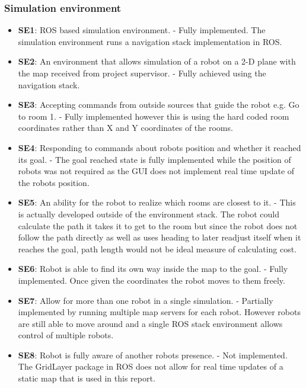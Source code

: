       \subsubsection{Simulation environment}
      \begin{itemize}
        \item \textbf{SE1}: ROS based simulation environment. - Fully implemented. The simulation environment runs a navigation stack implementation in ROS.

        \item \textbf{SE2}: An environment that allows simulation of a robot on a 2-D plane with the map received from project supervisor. - Fully achieved using the navigation stack.

        \item \textbf{SE3}: Accepting commands from outside sources that guide the robot e.g. Go to room 1. - Fully implemented however this is using the hard coded room coordinates rather than X and Y coordinates of the rooms.

        \item \textbf{SE4}: Responding to commands about robots position and whether it reached its goal. - The goal reached state is fully implemented while the position of robots was not required as the GUI does not implement real time update of the robots position.

        \item \textbf{SE5}: An ability for the robot to realize which rooms are closest to it. - This is actually developed outside of the environment stack. The robot could calculate the path it takes it to get to the room but since the robot does not follow the path directly as well as uses heading to later readjust itself when it reaches the goal, path length would not be ideal measure of calculating cost.

        \item \textbf{SE6}: Robot is able to find its own way inside the map to the goal. - Fully implemented. Once given the coordinates the robot moves to them freely.

        \item \textbf{SE7}: Allow for more than one robot in a single simulation. - Partially implemented by running multiple map servers for each robot. However robots are still able to move around and a single ROS stack environment allows control of multiple robots.

        \item \textbf{SE8}: Robot is fully aware of another robots presence. - Not implemented. The GridLayer package in ROS does not allow for real time updates of a static map that is used in this report.


\end{itemize}
